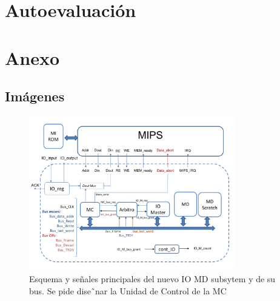 \documentclass{article}
\begin{document}
\section{Autoevaluación}
\lipsum[15-18]

\newpage
\section{Anexo}
\subsection{Imágenes}
\begin{figure}[htbp]
  \centering
  \includegraphics[page=1, width=0.8\textwidth, clip]{assets/AOC2_2024_Esquemas_Proy2.pdf}
  \caption{Esquema y señales principales del nuevo IO MD subsytem y de su bus. Se pide dise˜nar la
Unidad de Control de la MC}
  \label{fig:imagen}
\end{figure}

\newpage

\end{document}

